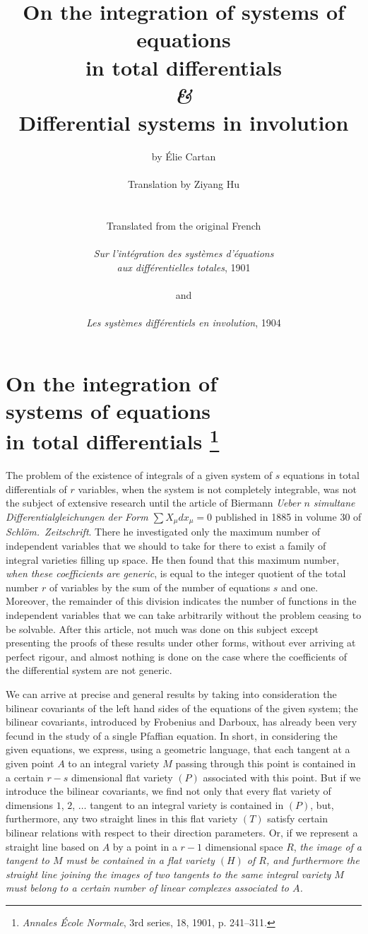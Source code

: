 \documentclass[leqno,11pt]{book}
\title{On the integration of systems of equations\\in total differentials\\
\emph{\&}\\
Differential systems in involution
}
\author{by Élie Cartan\\
\\
Translation by Ziyang Hu\\
\\
\\
Translated from the original French\\
\\
\emph{Sur l'intégration des systèmes d'équations}\\ 
\emph{aux différentielles totales}, 1901\\
\\
and\\
\\
\emph{Les systèmes différentiels en involution}, 1904
}
\theoremstyle{shape1}
\theoremstyle{shapesmall}
\begin{document}


\chapter*{On the integration of\\systems of equations\\in total differentials \footnote{\emph{Annales École Normale}, 3rd series, 18, 1901, p. 241–311.}}
\label{sec:integr-syst-equat}


The problem of the existence of integrals of a given system of $s$ equations in total differentials of $r$ variables, when the system is not completely integrable, was not the subject of extensive research until the article of Biermann \emph{Ueber $n$ simultane Differentialgleichungen der Form $\sum X_{\mu}dx_{\mu}=0$} published in 1885 in volume 30 of \emph{Schlöm.~Zeitschrift}. There he investigated only the maximum number of independent variables that we should to take for there to exist a family of integral varieties filling up space. He then found that this maximum number, \emph{when these coefficients are generic}, is equal to the integer quotient of the total number $r$ of variables by the sum of the number of equations $s$ and one. Moreover, the remainder of this division indicates the number of functions in the independent variables that we can take arbitrarily without the problem ceasing to be solvable. After this article, not much was done on this subject except presenting the proofs of these results under other forms, without ever arriving at perfect rigour, and almost nothing is done on the case where the coefficients of the differential system are not generic.

We can arrive at precise and general results by taking into consideration the bilinear covariants of the left hand sides of the equations of the given system; the bilinear covariants, introduced by Frobenius and Darboux, has already been very fecund in the study of a single Pfaffian equation. In short, in considering the given equations, we express, using a geometric language, that each tangent at a given point $A$ to an integral variety $M$ passing through this point is contained in a certain $r-s$ dimensional flat variety $(P)$ associated with this point. But if we introduce the bilinear covariants, we find not only that every flat variety of dimensions $1$, $2$, $\dots$ tangent to an integral variety is contained in $(P)$, but, furthermore, any two straight lines in this flat variety $(T)$ satisfy certain bilinear relations with respect to their direction parameters. Or, if we represent a straight line based on $A$ by a point in a $r-1$ dimensional space $R$, \emph{the image of a tangent to $M$ must be contained in a flat variety $(H)$ of $R$, and furthermore the straight line joining the images of two tangents to the same integral variety $M$ must belong to a certain number of linear complexes associated to $A$.}
\end{document}
